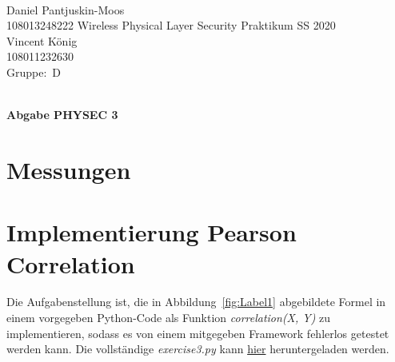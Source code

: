 \documentclass[12pt,a4paper]{article}
\newcommand{\student}{Daniel Pantjuskin-Moos\\ 108013248222 } %
\newcommand{\partner}{Vincent König\\ 108011232630} %
\newcommand{\group}{D} %
\newcommand{\hwheadtwo}{$ $
  \vspace{-2cm}
  
\noindent \student \qquad \qquad  Wireless Physical Layer Security Praktikum \hfill SS 2020 \\
\noindent \partner \\
\noindent Gruppe:~\group\\
$ $

  
\begin{center}    
{\Large \bf Abgabe PHYSEC 3}
\end{center}
}
\begin{document}
\hwheadtwo

\section{Messungen}

\section{Implementierung Pearson Correlation}


Die Aufgabenstellung ist, die in Abbildung~\ref{fig:Label1}
abgebildete Formel in einem vorgegeben Python-Code als Funktion 
\textit{correlation(X, Y)} zu implementieren, sodass es von einem 
mitgegeben Framework fehlerlos getestet werden kann. 
Die vollständige \textit{exercise3.py} kann  
\href{https://mega.nz/file/7gwx0BwR#dwkLdHX7AglZKYwp9poGQ-tEL20GtaqFy8LoT4TtV_g}
{hier} 
heruntergeladen werden.
\end{document}
